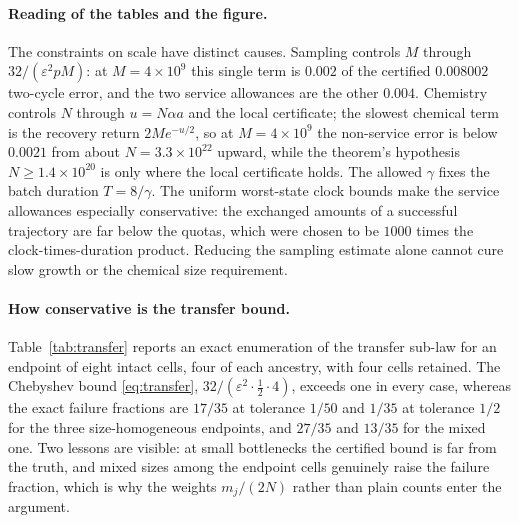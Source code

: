 \documentclass[11pt,a4paper]{article}
\theoremstyle{plain}
\theoremstyle{definition}
\theoremstyle{remark}
\newcommand{\eps}{\varepsilon}
\begin{document}
\paragraph{Reading of the tables and the figure.}
The constraints on scale have distinct causes. Sampling controls $M$ through $32/(\eps^2pM)$: at $M=4\times10^{9}$ this single term is $0.002$ of the certified $0.008002$ two-cycle error, and the two service allowances are the other $0.004$. Chemistry controls $N$ through $u=N\alpha a$ and the local certificate; the slowest chemical term is the recovery return $2Me^{-u/2}$, so at $M=4\times10^{9}$ the non-service error is below $0.0021$ from about $N=3.3\times10^{22}$ upward, while the theorem's hypothesis $N\ge1.4\times10^{20}$ is only where the local certificate holds. The allowed $\gamma$ fixes the batch duration $T=8/\gamma$. The uniform worst-state clock bounds make the service allowances especially conservative: the exchanged amounts of a successful trajectory are far below the quotas, which were chosen to be $1000$ times the clock-times-duration product. Reducing the sampling estimate alone cannot cure slow growth or the chemical size requirement.

\paragraph{How conservative is the transfer bound.}
Table~\ref{tab:transfer} reports an exact enumeration of the transfer sub-law for an endpoint of eight intact cells, four of each ancestry, with four cells retained. The Chebyshev bound \eqref{eq:transfer}, $32/(\eps^2\cdot\frac12\cdot4)$, exceeds one in every case, whereas the exact failure fractions are $17/35$ at tolerance $1/50$ and $1/35$ at tolerance $1/2$ for the three size-homogeneous endpoints, and $27/35$ and $13/35$ for the mixed one. Two lessons are visible: at small bottlenecks the certified bound is far from the truth, and mixed sizes among the endpoint cells genuinely raise the failure fraction, which is why the weights $m_j/(2N)$ rather than plain counts enter the argument.
\end{document}
